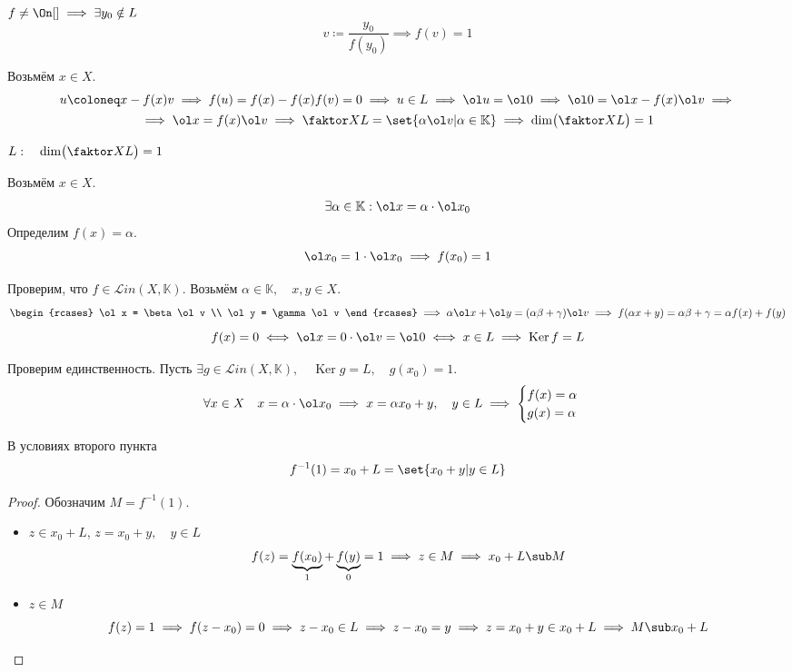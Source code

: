 \begin{eproof}
\item $ f \ne \On[] \implies \exists y_0 \notin L $
	$$ v \coloneq \frac{y_0}{f(y_0)} \implies f(v) = 1 $$

	Возьмём $ x \in X $.
	\begin{multline*}
		u \coloneq x - f(x)v \implies f(u) = f(x) - f(x)f(v) = 0 \implies u \in L \implies
		\ol u = \ol 0 \implies \ol 0 = \ol x - f(x) \ol v \implies \\
		\implies \ol x = f(x) \ol v \implies
		\faktor X L = \set{\alpha \ol v | \alpha \in \mathbb K} \implies
		\dim \bigl( \faktor X L \bigr) = 1
	\end{multline*}
\item $ L : \quad \dim \bigl( \faktor X L \bigr) = 1 $

	Возьмём $ x \in X $.
	$$ \exists \alpha \in \mathbb K : \ol x = \alpha \cdot \ol x_0 $$
	Определим $ f(x) = \alpha $.
	$$ \ol x_0 = 1 \cdot \ol x_0 \implies f(x_0) = 1 $$

	Проверим, что $ f \in \mathscr Lin(X, \mathbb K) $.
	Возьмём $ \alpha \in \mathbb K, \quad x, y \in X $.
	$$
	\begin{rcases}
		\ol x = \beta \ol v \\
		\ol y = \gamma \ol v
	\end{rcases} \implies \alpha \ol x + \ol y = (\alpha \beta + \gamma) \ol v \implies
	f(\alpha x + y) = \alpha \beta + \gamma = \alpha f(x) + f(y) $$
	$$ f(x) = 0 \iff \ol x = 0 \cdot \ol v = \ol 0 \iff x \in L \implies \operatorname{Ker} f = L $$

	Проверим единственность.
	Пусть $ \exists g \in \mathscr Lin(X, \mathbb K), \quad \operatorname{Ker} g = L, \quad
	g(x_0) = 1 $.
	$$ \forall x \in X \quad x = \alpha \cdot \ol x_0 \implies
	x = \alpha x_0 + y, \quad y \in L \implies
	\begin{cases}
		f(x) = \alpha \\
		g(x) = \alpha
	\end{cases} $$
\end{eproof}

\begin{remark}
	В условиях второго пункта
	$$ f^{-1}(1) = x_0 + L = \set{x_0 + y | y \in L} $$
\end{remark}

\begin{proof}
	Обозначим $ M = f^{-1}(1) $.
	\begin{itemize}
		\item $ z \in x_0 + L $, \ie $ z = x_0 + y, \quad y \in L $
			$$ f(z) = \underbrace{f(x_0)}_1 + \underbrace{f(y)}_0 = 1 \implies z \in M \implies
			x_0 + L \sub M $$
		\item $ z \in M $
			$$ f(z) = 1 \implies f(z - x_0) = 0 \implies z - x_0 \in L \implies z - x_0 = y \implies
			z = x_0 + y \in x_0 + L \implies M \sub x_0 + L $$
	\end{itemize}
\end{proof}

